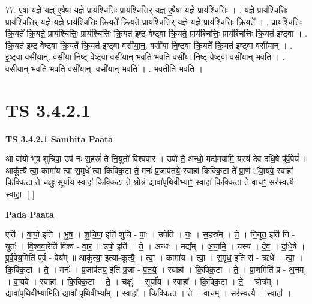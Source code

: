 \documentclass[17pt]{extarticle}
\begin{document}
77. ए॒षा य॒ज्ञे य॒ज्ञ् ए॒षैषा य॒ज्ञे प्राय॑श्चित्तिः॒ प्राय॑श्चित्तिर् य॒ज्ञ् ए॒षैषा य॒ज्ञे प्राय॑श्चित्तिः । . य॒ज्ञे प्राय॑श्चित्तिः॒ प्राय॑श्चित्तिर् य॒ज्ञे य॒ज्ञे प्राय॑श्चित्तिः क्रि॒यते᳚ क्रि॒यते॒ प्राय॑श्चित्तिर् य॒ज्ञे य॒ज्ञे प्राय॑श्चित्तिः क्रि॒यते᳚ । . प्राय॑श्चित्तिः क्रि॒यते᳚ क्रि॒यते॒ प्राय॑श्चित्तिः॒ प्राय॑श्चित्तिः क्रि॒यत॑ इ॒ष्ट् वेष्ट्वा क्रि॒यते॒ प्राय॑श्चित्तिः॒ प्राय॑श्चित्तिः क्रि॒यत॑ इ॒ष्ट्वा । . क्रि॒यत॑ इ॒ष्ट् वेष्ट्वा क्रि॒यते᳚ क्रि॒यत॑ इ॒ष्ट्वा वसी॑या॒न्॒. वसी॑या नि॒ष्ट्वा क्रि॒यते᳚ क्रि॒यत॑ इ॒ष्ट्वा वसी॑यान् । . इ॒ष्ट्वा वसी॑या॒न्॒. वसी॑या नि॒ष्ट् वेष्ट्वा वसी॑यान् भवति भवति॒ वसी॑या नि॒ष्ट् वेष्ट्वा वसी॑यान् भवति । . वसी॑यान् भवति भवति॒ वसी॑या॒न्॒. वसी॑यान् भवति । . भ॒व॒तीति॑ भवति । \newline
\pagebreak
{}

\section{ TS 3.4.2.1 }

\textbf{TS 3.4.2.1 } \newline
\textbf{Samhita Paata} \newline

आ वा॑यो भूष शुचिपा॒ उप॑ नः स॒हस्रं॑ ते नि॒युतो॑ विश्ववार । उपो॑ ते॒ अन्धो॒ मद्य॑मयामि॒ यस्य॑ देव दधि॒षे पू᳚र्व॒पेयं᳚ ॥ आकू᳚त्यै त्वा॒ कामा॑य त्वा स॒मृधे᳚ त्वा किक्कि॒टा ते॒ मनः॑ प्र॒जाप॑तये॒ स्वाहा॑ किक्कि॒टा ते᳚ प्रा॒णं ॅवा॒यवे॒ स्वाहा॑ किक्कि॒टा ते॒ चक्षुः॒ सूर्या॑य॒ स्वाहा॑ किक्कि॒टा ते॒ श्रोत्रं॒ द्यावा॑पृथि॒वीभ्याꣳ॒॒ स्वाहा॑ किक्कि॒टा ते॒ वाचꣳ॒॒ सर॑स्वत्यै॒ स्वाहा॒- [  ] \newline

\textbf{Pada Paata} \newline

एति॑ । वा॒यो॒ इति॑ । भू॒ष॒ । शु॒चि॒पा॒ इति॑ शुचि - पाः॒ । उपेति॑ । नः॒ । स॒हस्र᳚म् । ते॒ । नि॒युत॒ इति॑ नि - युतः॑ । वि॒श्व॒वा॒रेति॑ विश्व - वा॒र॒ ॥ उपो॒ इति॑ । ते॒ । अन्धः॑ । मद्य᳚म् । अ॒या॒मि॒ । यस्य॑ । दे॒व॒ । द॒धि॒षे । पू॒र्व॒पेय॒मिति॑ पूर्व - पेय᳚म् ॥ आकू᳚त्या॒ इत्या-कू॒त्यै॒ । त्वा॒ । कामा॑य । त्वा॒ । स॒मृध॒ इति॑ सं - ऋधे᳚ । त्वा॒ । कि॒क्कि॒टा । ते॒ । मनः॑ । प्र॒जाप॑तय॒ इति॑ प्र॒जा - प॒त॒ये॒ । स्वाहा᳚ । कि॒क्कि॒टा । ते॒ । प्रा॒णमिति॑ प्र - अ॒नम् । वा॒यवे᳚ । स्वाहा᳚ । कि॒क्कि॒टा । ते॒ । चक्षुः॑ । सूर्या॑य । स्वाहा᳚ । कि॒क्कि॒टा । ते॒ । श्रोत्र᳚म् । द्यावा॑पृथि॒वीभ्या॒मिति॒ द्यावा᳚-पृ॒थि॒वीभ्या᳚म् । स्वाहा᳚ । कि॒क्कि॒टा । ते॒ । वाच᳚म् । सर॑स्वत्यै । स्वाहा᳚ ।  \newline
\end{document}
